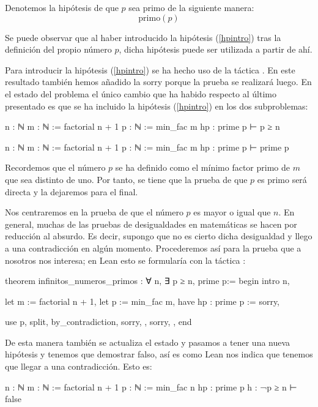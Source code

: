Denotemos la hipótesis de que \(p\) sea primo de la siguiente manera:
\begin{equation}\tag{hp}\label{hpintro}
  \text{primo}(p)
\end{equation}

Se puede observar que al haber introducido la hipótesis (\ref{hpintro}) tras
la definición del propio número \(p\), dicha hipótesis puede ser utilizada
a partir de ahí.

Para introducir la hipótesis (\ref{hpintro}) se ha hecho uso de la táctica
. En este resultado también hemos añadido la 
{sorry} porque la prueba se realizará luego. En el estado del problema el único
cambio que ha habido respecto al último presentado es que se ha incluido la
hipótesis (\ref{hpintro}) en los dos subproblemas:
\begin{leancode}
n : ℕ
m : ℕ := factorial n + 1
p : ℕ := min_fac m
hp : prime p
⊢ p ≥ n

n : ℕ
m : ℕ := factorial n + 1
p : ℕ := min_fac m
hp : prime p
⊢ prime p
\end{leancode}

Recordemos que el número \(p\) se ha definido como el mínimo factor primo de
\(m\) que sea distinto de uno. Por tanto, se tiene que la prueba de que \(p\)
es primo será directa y la dejaremos para el final.

Nos centraremos en la prueba de que el número \(p\) es mayor o igual que
\(n\). En general, muchas de las pruebas de desigualdades en
matemáticas se hacen por reducción al absurdo. Es decir, supongo que no
es cierto dicha desigualdad y llego a una contradicción en algún
momento. Procederemos así para la prueba que a nosotros nos interesa; en
Lean esto se formularía con la táctica
:
\begin{leancode}
theorem infinitos_numeros_primos : ∀ n, ∃ p ≥ n, prime p:=
begin
  intro n,

  let m := factorial n + 1,
  let p := min_fac m,
  have hp : prime p := sorry,

  use p,
  split,
  { by_contradiction,
    sorry, },
  { sorry, },
end
\end{leancode}

De esta manera también se actualiza el estado y pasamos a tener una
nueva hipótesis y tenemos que demostrar falso, así es como Lean nos
indica que tenemos que llegar a una contradicción. Esto es:
\begin{leancode}
n : ℕ
m : ℕ := factorial n + 1
p : ℕ := min_fac n
hp : prime p
h : ¬p ≥ n
⊢ false
\end{leancode}

